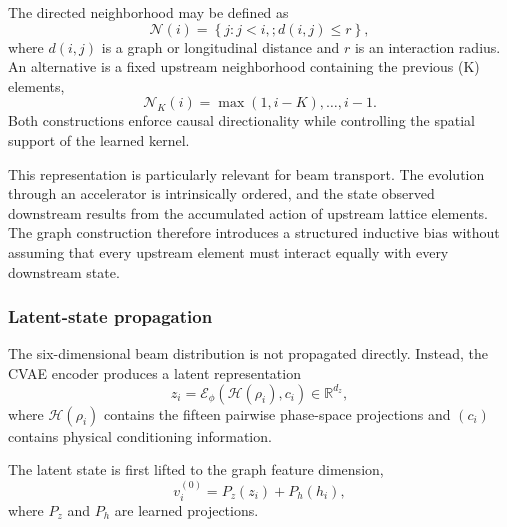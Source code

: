 \documentclass[11pt,a4paper]{article}
\begin{document}
\begin{sloppypar}
The directed neighborhood may be defined as
\begin{equation}
\mathcal{N}(i)
=
\left\{
j:
j<i,;
d(i,j)\le r
\right\},
\label{eq:gno_directed_neighborhood}
\end{equation}
where $d(i,j)$ is a graph or longitudinal distance and $r$ is an interaction radius. An alternative is a fixed upstream neighborhood containing the previous (K) elements, 
\begin{equation}
\mathcal{N}_{K}(i)
=
{
\max(1,i-K),
\ldots,
i-1
}.
\label{eq:gno_k_neighborhood}
\end{equation}
Both constructions enforce causal directionality while controlling the spatial support of the learned kernel.

This representation is particularly relevant for beam transport. The evolution through an accelerator is intrinsically ordered, and the state observed downstream results from the accumulated action of upstream lattice elements. The graph construction therefore introduces a structured inductive bias without assuming that every upstream element must interact equally with every downstream state.

\subsubsection{Latent-state propagation}
\label{subsubsec:gno_latent_propagation}

The six-dimensional beam distribution is not propagated directly. Instead, the CVAE encoder produces a latent representation
\begin{equation}
z_i
=
\mathcal{E}_{\phi}
\left(
\mathcal{H}(\rho_i),
c_i
\right)
\in
\mathbb{R}^{d_z},
\label{eq:gno_latent_state}
\end{equation}
where $\mathcal{H}(\rho_i)$ contains the fifteen pairwise phase-space projections and $(c_i)$ contains physical conditioning information.

The latent state is first lifted to the graph feature dimension,
\begin{equation}
v_i^{(0)}
=
P_z(z_i)
+
P_h(h_i),
\label{eq:gno_latent_lift}
\end{equation}
where $P_z$ and $P_h$ are learned projections.


\end{sloppypar}
\end{document}
